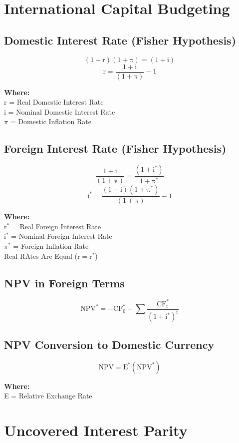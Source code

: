 \documentclass[11pt, english]{article}
\begin{document}
\newpage

\section{International Capital Budgeting}

	\subsection{Domestic Interest Rate (Fisher Hypothesis)}

	$$\mathrm{(1+r)(1+\pi)=(1+i)}$$
	$$\mathrm{r=\frac{1+i}{(1+\pi)}-1}$$

	\textbf{Where:}\\
	r = Real Domestic Interest Rate\\
	i = Nominal Domestic Interest Rate\\
	$\pi$ = Domestic Inflation Rate

	\subsection{Foreign Interest Rate (Fisher Hypothesis)}

	$$\mathrm{\frac{1+i}{(1+\pi)}=\frac{(1+i^*)}{1+\pi^*}}$$
	$$\mathrm{i^*=\frac{(1+i)(1+\pi^*)}{(1+\pi)}-1}$$

	\textbf{Where:}\\
	r$^*$ = Real Foreign Interest Rate\\
	i$^*$ = Nominal Foreign Interest Rate\\
	$\pi^*$ = Foreign Inflation Rate\\
	Real RAtes Are Equal ($\mathrm{r=r^*}$)

	\subsection{NPV in Foreign Terms}

	$$\mathrm{NPV^*=-CF_0^*+\sum\frac{CF_t^*}{(1+i^*)^t}}$$

	\subsection{NPV Conversion to Domestic Currency}

	$$\mathrm{NPV=E^*(NPV^*)}$$

	\textbf{Where:}\\
	E = Relative Exchange Rate

\newpage

\section{Uncovered Interest Parity}
\end{document}
